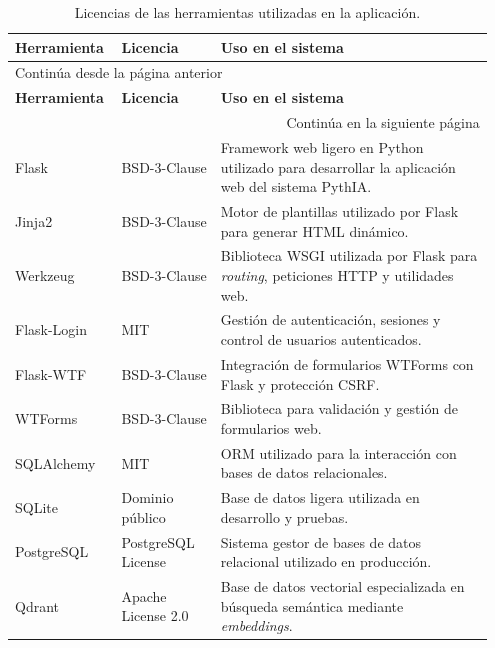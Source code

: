 \begin{longtable}{p{0.20\linewidth} p{0.20\linewidth} p{0.55\linewidth}}
\caption{Licencias de las herramientas utilizadas en la aplicación.}
\label{tab:licencias}\\

\toprule
\textbf{Herramienta} & \textbf{Licencia} & \textbf{Uso en el sistema} \\
\midrule
\endfirsthead

\multicolumn{3}{l}{Continúa desde la página anterior}\\
\toprule
\textbf{Herramienta} & \textbf{Licencia} & \textbf{Uso en el sistema} \\
\midrule
\endhead

\midrule
\multicolumn{3}{r}{Continúa en la siguiente página}\\
\endfoot

\bottomrule
\endlastfoot

Flask & BSD-3-Clause & Framework web ligero en Python utilizado para desarrollar la aplicación web del sistema PythIA. \\

Jinja2 & BSD-3-Clause & Motor de plantillas utilizado por Flask para generar HTML dinámico. \\

Werkzeug & BSD-3-Clause & Biblioteca WSGI utilizada por Flask para \emph{routing}, peticiones HTTP y utilidades web. \\

Flask-Login & MIT & Gestión de autenticación, sesiones y control de usuarios autenticados. \\

Flask-WTF & BSD-3-Clause & Integración de formularios WTForms con Flask y protección CSRF. \\

WTForms & BSD-3-Clause & Biblioteca para validación y gestión de formularios web. \\

SQLAlchemy & MIT & ORM utilizado para la interacción con bases de datos relacionales. \\

SQLite & Dominio público & Base de datos ligera utilizada en desarrollo y pruebas. \\

PostgreSQL & PostgreSQL License & Sistema gestor de bases de datos relacional utilizado en producción. \\

Qdrant & Apache License 2.0 & Base de datos vectorial especializada en búsqueda semántica mediante \emph{embeddings}. \\


\end{longtable}
